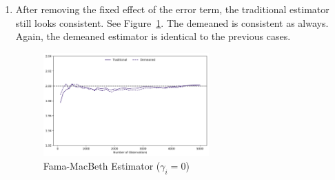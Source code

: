 \begin{solution}
\begin{enumerate}[label = (\alph*)]
    \item After removing the fixed effect of the error term, the traditional estimator still looks consistent. See Figure~\ref{fig:beta_fm_c}. The demeaned is consistent as always. Again, the demeaned estimator is identical to the previous cases.
    \begin{figure}[!htbp]
        \centering
        \includegraphics[width=0.6\textwidth]{../../images/beta_fm_c}
        \caption{Fama-MacBeth Estimator (\(\gamma_i = 0\))}
        \label{fig:beta_fm_c}
    \end{figure}


\end{enumerate}
\end{solution}
